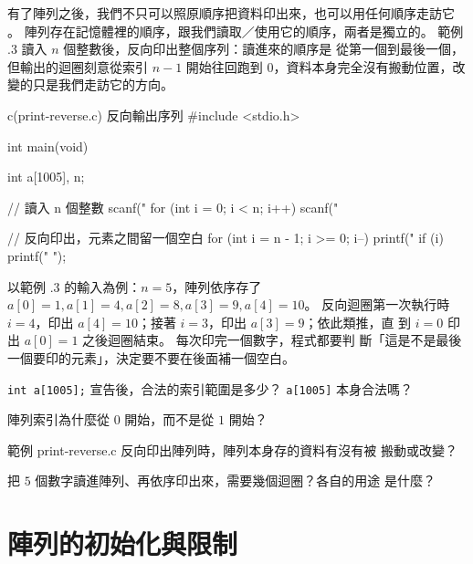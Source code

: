 有了陣列之後，我們不只可以照原順序把資料印出來，也可以用任何順序走訪它
。 陣列存在記憶體裡的順序，跟我們讀取／使用它的順序，兩者是獨立的。
範例 \thechapter.3 讀入 $n$ 個整數後，反向印出整個序列：讀進來的順序是
從第一個到最後一個，但輸出的迴圈刻意從索引 $n - 1$ 開始往回跑到
$0$，資料本身完全沒有搬動位置，改變的只是我們走訪它的方向。

\begin{example}{c}{(print-reverse.c) 反向輸出序列}
#include <stdio.h>

int main(void) {
    int a[1005], n;

    // 讀入 n 個整數
    scanf("%
    for (int i = 0; i < n; i++) {
        scanf("%
    }

    // 反向印出，元素之間留一個空白
    for (int i = n - 1; i >= 0; i--) {
        printf("%
        if (i) {
            printf(" ");
        }
    }
}
\end{example}


以範例 \thechapter.3 的輸入為例：$n = 5$，陣列依序存了
$a[0]=1, a[1]=4, a[2]=8, a[3]=9, a[4]=10$。 反向迴圈第一次執行時
$i = 4$，印出 $a[4] = 10$；接著 $i = 3$，印出 $a[3] = 9$；依此類推，直
到 $i = 0$ 印出 $a[0] = 1$ 之後迴圈結束。 每次印完一個數字，程式都要判
斷「這是不是最後一個要印的元素」，決定要不要在後面補一個空白。


\begin{drills}[label=drills:array-declare-read]
\item \texttt{int a[1005];} 宣告後，合法的索引範圍是多少？
\texttt{a[1005]} 本身合法嗎？
\item 陣列索引為什麼從 $0$ 開始，而不是從 $1$ 開始？
\item 範例 print-reverse.c 反向印出陣列時，陣列本身存的資料有沒有被
搬動或改變？
\item 把 $5$ 個數字讀進陣列、再依序印出來，需要幾個迴圈？各自的用途
是什麼？
\end{drills}

\section{陣列的初始化與限制}
\label{sec:array-init-limits}

